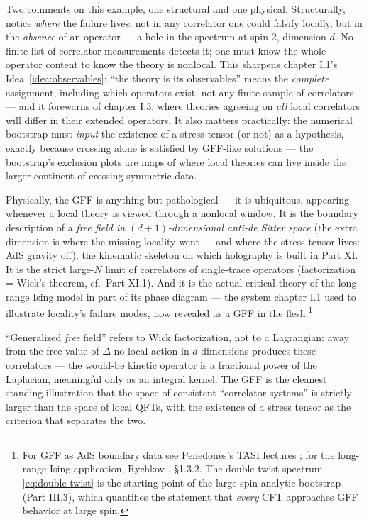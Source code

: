 Two comments on this example, one structural and one physical. Structurally,
notice \emph{where} the failure lives: not in any correlator one could
falsify locally, but in the \emph{absence} of an operator --- a hole in the
spectrum at spin 2, dimension $d$. No finite list of correlator measurements
detects it; one must know the whole operator content to know the theory is
nonlocal. This sharpens chapter I.1's Idea~\ref{idea:observables}: ``the
theory is its observables'' means the \emph{complete} assignment, including
which operators exist, not any finite sample of correlators --- and it
forewarns of chapter I.3, where theories agreeing on \emph{all} local
correlators will differ in their extended operators. It also matters
practically: the numerical bootstrap must \emph{input} the existence of a
stress tensor (or not) as a hypothesis, exactly because crossing alone is
satisfied by GFF-like solutions --- the bootstrap's exclusion plots are
maps of where local theories can live inside the larger continent of
crossing-symmetric data.

Physically, the GFF is anything but pathological --- it is ubiquitous,
appearing whenever a local theory is viewed through a nonlocal window.
It is the boundary description of a \emph{free field in $(d+1)$-dimensional
anti-de Sitter space} (the extra dimension is where the missing locality
went --- and where the stress tensor lives: AdS gravity off), the kinematic
skeleton on which holography is built in Part XI. It is the strict large-$N$
limit of correlators of single-trace operators (factorization = Wick's
theorem, cf.\ Part XI.1). And it is the actual critical theory of the
long-range Ising model in part of its phase diagram --- the system chapter
I.1 used to illustrate locality's failure modes, now revealed as a GFF in
the flesh.\footnote{For GFF as AdS boundary data see Penedones's TASI
lectures ; for the long-range Ising application, Rychkov
, \S1.3.2. The double-twist spectrum
\eqref{eq:double-twist} is the starting point of the large-spin analytic
bootstrap (Part III.3), which quantifies the statement that \emph{every} CFT
approaches GFF behavior at large spin.}

\begin{nnote}
``Generalized \emph{free} field'' refers to Wick factorization, not to a
Lagrangian: away from the free value of $\Delta$ no local action in $d$
dimensions produces these correlators --- the would-be kinetic operator is a
fractional power of the Laplacian, meaningful only as an integral
kernel. The GFF is the cleanest standing illustration that the
space of consistent ``correlator systems'' is strictly larger than the space
of local QFTs, with the existence of a stress tensor as the criterion that
separates the two.
\end{nnote}

